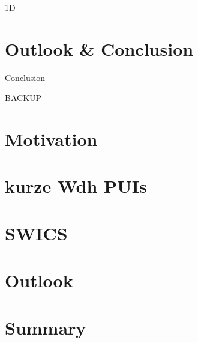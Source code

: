 \documentclass{beamer}
\begin{document}

\begin{frame}{1D}

\end{frame}






\section{Outlook \& Conclusion}

\begin{frame}[plain]{Conclusion}

\end{frame}


\begin{frame}[plain]{}
\begin{center}
	{\Huge BACKUP}
\end{center}
\end{frame}

%
%
%
\begin{frame}[plain]{}

\end{frame}

%
%
%
\begin{frame}[plain]{}

\end{frame}


%
%
%
\begin{frame}[plain]{}

\end{frame}


%
%
%
\begin{frame}[plain]{}

\end{frame}



%
%
%
\section{Motivation}
\section{kurze Wdh PUIs}
\section{SWICS}

\section{Outlook}
\section{Summary}
%
%
%
\end{document}
